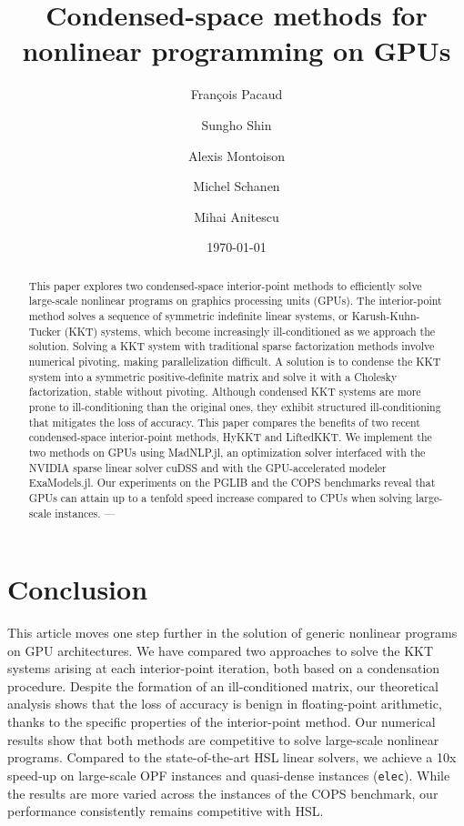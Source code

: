 \documentclass[smallextended]{svjour3}
\title{Condensed-space methods for nonlinear programming on GPUs}
\author{François Pacaud \and
Sungho Shin \and
Alexis Montoison \and
Michel Schanen \and
Mihai Anitescu
}
\date{\today}
\begin{document}
\maketitle

\begin{abstract}
  This paper explores two condensed-space interior-point methods to efficiently solve large-scale nonlinear programs on graphics processing units (GPUs). The interior-point method solves a sequence of symmetric indefinite linear systems, or Karush-Kuhn-Tucker (KKT) systems, which become increasingly ill-conditioned as we approach the solution. Solving a KKT system with traditional sparse factorization methods involve numerical pivoting, making parallelization difficult. A solution is to condense the KKT system into a symmetric positive-definite matrix and solve it with a Cholesky factorization, stable without pivoting. Although condensed KKT systems are more prone to ill-conditioning than the original ones, they exhibit structured ill-conditioning that mitigates the loss of accuracy. This paper compares the benefits of two recent condensed-space interior-point methods, HyKKT and LiftedKKT. We implement the two methods on GPUs using MadNLP.jl, an optimization solver interfaced with the NVIDIA sparse linear solver cuDSS and with the GPU-accelerated modeler ExaModels.jl. Our experiments on the PGLIB and the COPS benchmarks reveal that GPUs can attain up to a tenfold speed increase compared to CPUs when solving large-scale instances. ---
\end{abstract}









\section{Conclusion}
This article moves one step further in the solution of generic nonlinear
programs on GPU architectures. We have compared two approaches
to solve the KKT systems arising at each interior-point iteration, both
based on a condensation procedure.
Despite the formation of an ill-conditioned matrix, our theoretical analysis shows that the loss of accuracy is benign in floating-point arithmetic, thanks to the specific properties of the interior-point method.
Our numerical results show that both methods are competitive to solve large-scale
nonlinear programs.
Compared to the state-of-the-art HSL linear solvers, we achieve a 10x speed-up on large-scale OPF instances and quasi-dense instances (\texttt{elec}). While the results are more varied across the instances of the COPS benchmark, our performance consistently remains competitive with HSL.
\end{document}
